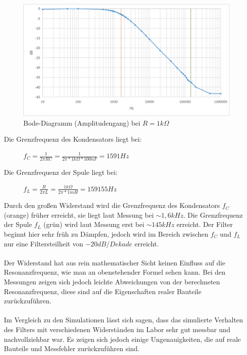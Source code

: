 \documentclass[12pt,a4paper,titlepage]{article}
\begin{document}
\begin{figure}[H]
  \centering
  \includegraphics[width=150mm]{bode_rlc_1k.png}
  \caption{Bode-Diagramm (Amplitudengang) bei $R=1k\Omega$}
\end{figure}

\noindent Die Grenzfrequenz des Kondensators liegt bei:
\begin{figure}[H]
  \centering
  $f_C = \frac{1}{2\pi RC} = \frac{1}{2\pi *1k\Omega*100nF} = 1591Hz$
\end{figure}

\noindent Die Grenzfrequenz der Spule liegt bei:
\begin{figure}[H]
  \centering
$f_L = \frac{R}{2\pi L} = \frac{1k\Omega}{2\pi *1mH} = 159155Hz$
\end{figure}

\noindent Durch den großen Widerstand wird die Grenzfrequenz des Kondensators $f_C$ (orange) früher erreicht, sie liegt laut Messung bei $\sim1,6kHz$. Die Grenzfrequenz der Spule $f_L$ (gr\"un) wird laut Messung erst bei $\sim145kHz$ erreicht. Der Filter beginnt hier sehr früh zu Dämpfen, jedoch wird im Bereich zwischen $f_C$ und $f_L$ nur eine Filtersteilheit von $-20dB/Dekade$ erreicht.\\\\

\noindent Der Widerstand hat aus rein mathematischer Sicht keinen Einfluss auf die Resonanzfrequenz, wie man an obenstehender Formel sehen kann. Bei den Messungen zeigen sich jedoch leichte Abweichungen von der berechneten Resonanzfrequenz, diese sind auf die Eigenschaften realer Bauteile zurückzuführen.\\\\

\noindent Im Vergleich zu den Simulationen lässt sich sagen, dass das simulierte Verhalten des Filters mit verschiedenen Widerständen im Labor sehr gut messbar und nachvollziehbar war. Es zeigen sich jedoch einige Ungenauigkeiten, die auf reale Bauteile und Messfehler zurückzuführen sind.\\\\
\end{document}
